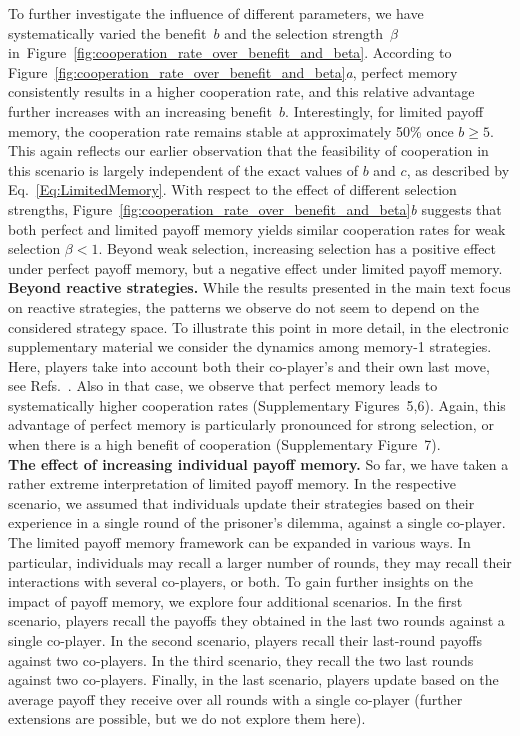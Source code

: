\documentclass[11pt]{article}
\def\esm{electronic supplementary material}
\newcommand{\FigDependenceParameters}{Figure~\ref{fig:cooperation_rate_over_benefit_and_beta}}
\newcommand{\FigMemoryOneParameters}{Supplementary Figure~7}
\theoremstyle{plainCl1}
\theoremstyle{plainCl2}
\begin{document}

To further investigate the influence of different parameters, we have systematically varied the benefit~$b$ and the selection strength~$\beta$ in~\FigDependenceParameters.
According to \FigDependenceParameters{\it a}, perfect memory consistently results in a higher cooperation rate, and this relative advantage further increases with an increasing benefit~$b$. 
Interestingly, for limited payoff memory, the cooperation rate remains stable at approximately 50\% once \(b \!\ge\! 5\).
This again reflects our earlier observation that the feasibility of cooperation in this scenario is largely independent of the exact values of $b$ and $c$, as described by Eq.~\eqref{Eq:LimitedMemory}. 
With respect to the effect of different selection strengths, \FigDependenceParameters{\it b} suggests that both perfect and limited payoff memory yields similar cooperation rates for weak selection \(\beta \!<\! 1\). 
Beyond weak selection, increasing selection has a positive effect under perfect payoff memory, but a negative effect under limited payoff memory.\\


\noindent
{\bf Beyond reactive strategies.} While the results presented in the main text focus on reactive strategies, the patterns we observe do not seem to depend on the considered strategy space. 
To illustrate this point in more detail, in the \esm{} we consider the dynamics among memory-1 strategies. 
Here, players take into account both their co-player's and their own last move, see Refs.~\citep{nowak:Nature:1993,imhof:JTB:2007}. 
Also in that case, we observe that perfect memory leads to systematically higher cooperation rates (Supplementary Figures~5,6).
Again, this advantage of perfect memory is particularly pronounced for strong selection, or when there is a high benefit of cooperation (\FigMemoryOneParameters).\\ 


\noindent 
{\bf The effect of increasing individual payoff memory.}
So far, we have taken a rather extreme interpretation of limited payoff memory. 
In the respective scenario, we assumed that individuals update their strategies based on their experience in a single round of the prisoner's dilemma, against a single co-player. 
The limited payoff memory framework can be expanded in various ways. 
In particular, individuals may recall a larger number of rounds, they may recall their interactions with several co-players, or both. 
To gain further insights on the impact of payoff memory, we explore four additional scenarios. 
In the first scenario, players recall the payoffs they obtained in the last two rounds against a single co-player. 
In the second scenario, players recall their last-round payoffs against two co-players. 
In the third scenario, they recall the two last rounds against two co-players. 
Finally, in the last scenario, players update based on the average payoff they
receive over all rounds with a single co-player (further extensions are possible, but we do not explore them here).
\end{document}
